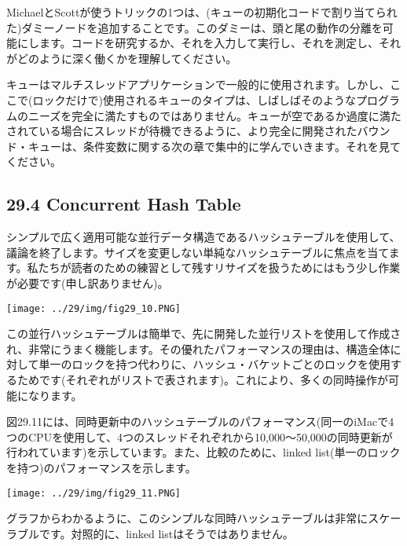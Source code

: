 MichaelとScottが使うトリックの1つは、(キューの初期化コードで割り当てられた)ダミーノードを追加することです。このダミーは、頭と尾の動作の分離を可能にします。コードを研究するか、それを入力して実行し、それを測定し、それがどのように深く働くかを理解してください。

キューはマルチスレッドアプリケーションで一般的に使用されます。しかし、ここで(ロックだけで)使用されるキューのタイプは、しばしばそのようなプログラムのニーズを完全に満たすものではありません。キューが空であるか過度に満たされている場合にスレッドが待機できるように、より完全に開発されたバウンド・キューは、条件変数に関する次の章で集中的に学んでいきます。それを見てください。

\hypertarget{concurrent-hash-table}{%
\subsection*{29.4 Concurrent Hash Table}\label{concurrent-hash-table}}

シンプルで広く適用可能な並行データ構造であるハッシュテーブルを使用して、議論を終了します。サイズを変更しない単純なハッシュテーブルに焦点を当てます。私たちが読者のための練習として残すリサイズを扱うためにはもう少し作業が必要です(申し訳ありません)。

\texttt{[image: ../29/img/fig29\_10.PNG]}

この並行ハッシュテーブルは簡単で、先に開発した並行リストを使用して作成され、非常にうまく機能します。その優れたパフォーマンスの理由は、構造全体に対して単一のロックを持つ代わりに、ハッシュ・バケットごとのロックを使用するためです(それぞれがリストで表されます)。これにより、多くの同時操作が可能になります。

図29.11には、同時更新中のハッシュテーブルのパフォーマンス(同一のiMacで4つのCPUを使用して、4つのスレッドそれぞれから10,000〜50,000の同時更新が行われています)を示しています。また、比較のために、linked
list(単一のロックを持つ)のパフォーマンスを示します。

\texttt{[image: ../29/img/fig29\_11.PNG]}

グラフからわかるように、このシンプルな同時ハッシュテーブルは非常にスケーラブルです。対照的に、linked
listはそうではありません。


